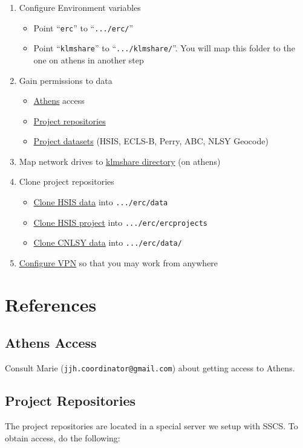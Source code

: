 \documentclass{article}
\begin{document}
\begin{enumerate}
		\item Configure Environment variables
		\begin{itemize}
			\item Point ``\texttt{erc}'' to ``\texttt{.../erc/}''
			\item Point ``\texttt{klmshare}'' to ``\texttt{.../klmshare/}''. You 
			will map this folder to the one on athens in another step
		\end{itemize}
		\item Gain permissions to data
		\begin{itemize}
			\item \hyperref[sec:athens]{Athens} access
			\item \hyperref[sec:repoaccess]{Project repositories}
			\item \hyperref[sec:dataacess]{Project datasets} (HSIS, ECLS-B, Perry, ABC, NLSY Geocode)
		\end{itemize}
		\item Map network drives to \hyperref[sec:klmmap]{klmshare directory} (on athens)
		\item Clone project repositories
		\begin{itemize}
			\item \hyperref[sec:clonehsis]{Clone HSIS data} into 
			\texttt{.../erc/data}
			\item \hyperref[sec:cloneredmine]{Clone HSIS project} into
			\texttt{.../erc/ercprojects}
			\item \hyperref[sec:cloneredmine]{Clone CNLSY data} into 
			\texttt{.../erc/data/}
		\end{itemize}
		\item \hyperref[sec:vpn]{Configure VPN} so that you may work from anywhere
	\end{enumerate}

	\clearpage

	\section*{References}

	\subsection*{Athens Access} \label{sec:athens}
	Consult Marie (\texttt{jjh.coordinator@gmail.com}) about getting access to Athens. 

	\subsection*{Project Repositories} \label{sec:repoaccess}
	The project repositories are located in a special server we setup with
	SSCS. To obtain access, do the following:
\end{document}
